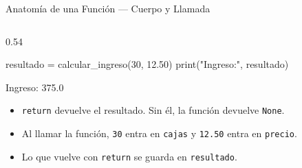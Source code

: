 \documentclass[aspectratio=169, 11pt]{beamer}
\begin{document}
\begin{frame}[fragile,shrink=26]{Anatomía de una Función --- Cuerpo y Llamada}
\begin{columns}[T]
\begin{column}{0.54\textwidth}
\begin{pyblock}
resultado = calcular_ingreso(30, 12.50)
print("Ingreso:", resultado)
      \end{pyblock}
      \vspace{-2pt}
      \begin{outputblock}
Ingreso: 375.0
      \end{outputblock}

      \vspace{2pt}
      {\scriptsize\color{textMuted}
      \begin{itemize}\setlength{\itemsep}{2pt}
        \item[{\color{arcaRed}\scriptsize\faArrowRight}]
          \texttt{return} devuelve el resultado.
          Sin él, la función devuelve \texttt{None}.
        \item[{\color{arcaRed}\scriptsize\faArrowRight}]
          Al llamar la función, \texttt{30} entra en
          \texttt{cajas} y \texttt{12.50} entra en \texttt{precio}.
        \item[{\color{arcaRed}\scriptsize\faArrowRight}]
          Lo que vuelve con \texttt{return} se guarda
          en \texttt{resultado}.
      \end{itemize}
      }
    \end{column}
  \end{columns}
\end{frame}
\end{document}
